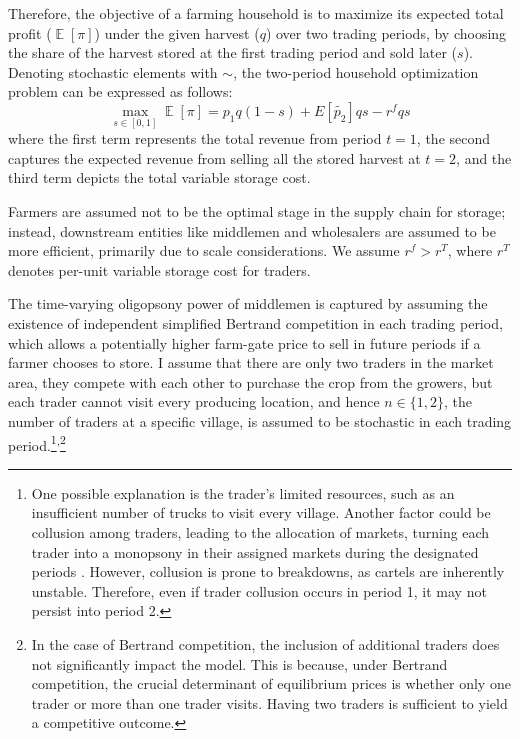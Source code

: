 Therefore, the objective of a farming household is to maximize its expected total profit ($\mathop{\mathbb{E}}[\pi]$) under the given harvest ($q$) over two trading periods, by choosing the share of the harvest stored at the first trading period and sold later ($s$). Denoting stochastic elements with $\sim$, the two-period household optimization problem can be expressed as follows:
\begin{equation}
    \max_{s \in [0,1]} \mathop{\mathbb{E}}[\pi] =  p_1 q(1-s)+E\left[\tilde{p_2}\right]q s -r^f q s 
\label{Eq: Baseline Basic}
\end{equation}
where the first term represents the total revenue from period $t=1$, the second captures the expected revenue from selling all the stored harvest at $t=2$, and the third term depicts the total variable storage cost. 

Farmers are assumed not to be the optimal stage in the supply chain for storage; instead, downstream entities like middlemen and wholesalers are assumed to be more efficient, primarily due to scale considerations. We assume $r^f > r^T$, where $r^T$ denotes per-unit variable storage cost for traders.

The time-varying oligopsony power of middlemen is captured by assuming the existence of independent simplified Bertrand competition in each trading period, which allows a potentially higher farm-gate price to sell in future periods if a farmer chooses to store. I assume that there are only two traders in the market area, they compete with each other to purchase the crop from the growers, but each trader cannot visit every producing location, and hence $n \in\{1,2\}$, the number of traders at a specific village, is assumed to be stochastic in each trading period.\footnote{One possible explanation is the trader's limited resources, such as an insufficient number of trucks to visit every village. Another factor could be collusion among traders, leading to the allocation of markets, turning each trader into a monopsony in their assigned markets during the designated periods \citep{herings2005intertemporal}. However, collusion is prone to breakdowns, as cartels are inherently unstable. Therefore, even if trader collusion occurs in period 1, it may not persist into period 2.}\textsuperscript{,}\footnote{In the case of Bertrand competition, the inclusion of additional traders does not significantly impact the model. This is because, under Bertrand competition, the crucial determinant of equilibrium prices is whether only one trader or more than one trader visits. Having two traders is sufficient to yield a competitive outcome.}

